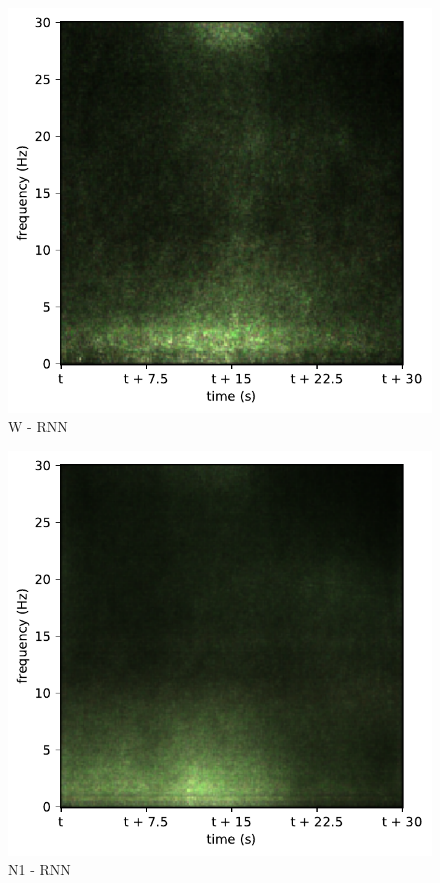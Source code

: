 \begin{subfigure}{.16\textwidth}
  \centering
  \includegraphics[width=1\linewidth]{./pics/class_rnn_0}
  \caption{W - RNN}
  \label{fig_1_31}
\end{subfigure}%
\begin{subfigure}{.16\textwidth}
  \centering
  \includegraphics[width=1\linewidth]{./pics/class_rnn_1}
  \caption{N1 - RNN}
  \label{fig_1_32}
\end{subfigure}%

